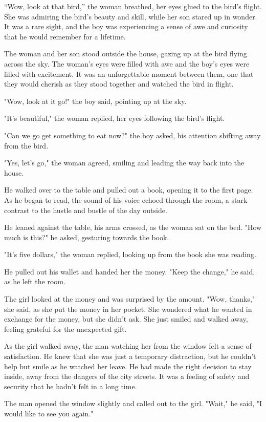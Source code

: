 \documentclass[smalldemyvopaper,11pt,twoside,onecolumn,openright,extrafontsizes]{memoir}
\begin{document}
“Wow, look at that bird,” the woman breathed, her eyes glued to the bird's flight. She was admiring the bird's beauty and skill, while her son stared up in wonder. It was a rare sight, and the boy was experiencing a sense of awe and curiosity that he would remember for a lifetime.\par
The woman and her son stood outside the house, gazing up at the bird flying across the sky. The woman's eyes were filled with awe and the boy's eyes were filled with excitement. It was an unforgettable moment between them, one that they would cherish as they stood together and watched the bird in flight.\par
"Wow, look at it go!" the boy said, pointing up at the sky.\par
"It's beautiful," the woman replied, her eyes following the bird's flight.\par
"Can we go get something to eat now?" the boy asked, his attention shifting away from the bird.\par
"Yes, let's go," the woman agreed, smiling and leading the way back into the house.\par
He walked over to the table and pulled out a book, opening it to the first page. As he began to read, the sound of his voice echoed through the room, a stark contrast to the hustle and bustle of the day outside.\par
He leaned against the table, his arms crossed, as the woman sat on the bed. "How much is this?" he asked, gesturing towards the book.\par
"It's five dollars," the woman replied, looking up from the book she was reading.\par
He pulled out his wallet and handed her the money. "Keep the change," he said, as he left the room.\par
The girl looked at the money and was surprised by the amount. "Wow, thanks," she said, as she put the money in her pocket. She wondered what he wanted in exchange for the money, but she didn't ask. She just smiled and walked away, feeling grateful for the unexpected gift.\par
As the girl walked away, the man watching her from the window felt a sense of satisfaction. He knew that she was just a temporary distraction, but he couldn't help but smile as he watched her leave. He had made the right decision to stay inside, away from the dangers of the city streets. It was a feeling of safety and security that he hadn't felt in a long time.\par
The man opened the window slightly and called out to the girl. "Wait," he said, "I would like to see you again."\par
\end{document}
